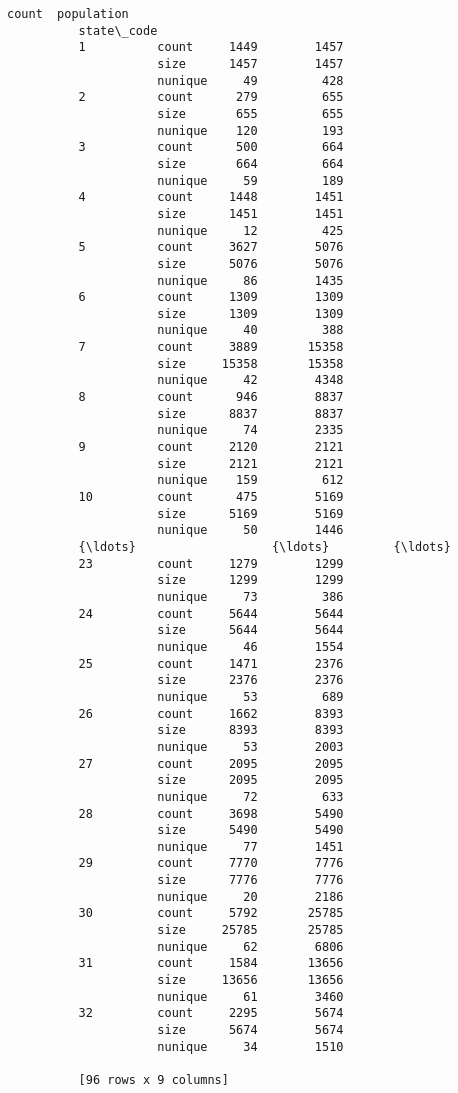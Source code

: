 \documentclass[11pt]{article}
\begin{document}
\begin{Verbatim}[commandchars=\\\{\}]
                              count  population  
          state\_code                             
          1          count     1449        1457  
                     size      1457        1457  
                     nunique     49         428  
          2          count      279         655  
                     size       655         655  
                     nunique    120         193  
          3          count      500         664  
                     size       664         664  
                     nunique     59         189  
          4          count     1448        1451  
                     size      1451        1451  
                     nunique     12         425  
          5          count     3627        5076  
                     size      5076        5076  
                     nunique     86        1435  
          6          count     1309        1309  
                     size      1309        1309  
                     nunique     40         388  
          7          count     3889       15358  
                     size     15358       15358  
                     nunique     42        4348  
          8          count      946        8837  
                     size      8837        8837  
                     nunique     74        2335  
          9          count     2120        2121  
                     size      2121        2121  
                     nunique    159         612  
          10         count      475        5169  
                     size      5169        5169  
                     nunique     50        1446  
          {\ldots}                   {\ldots}         {\ldots}  
          23         count     1279        1299  
                     size      1299        1299  
                     nunique     73         386  
          24         count     5644        5644  
                     size      5644        5644  
                     nunique     46        1554  
          25         count     1471        2376  
                     size      2376        2376  
                     nunique     53         689  
          26         count     1662        8393  
                     size      8393        8393  
                     nunique     53        2003  
          27         count     2095        2095  
                     size      2095        2095  
                     nunique     72         633  
          28         count     3698        5490  
                     size      5490        5490  
                     nunique     77        1451  
          29         count     7770        7776  
                     size      7776        7776  
                     nunique     20        2186  
          30         count     5792       25785  
                     size     25785       25785  
                     nunique     62        6806  
          31         count     1584       13656  
                     size     13656       13656  
                     nunique     61        3460  
          32         count     2295        5674  
                     size      5674        5674  
                     nunique     34        1510  
          
          [96 rows x 9 columns]
\end{Verbatim}
            
\end{document}
